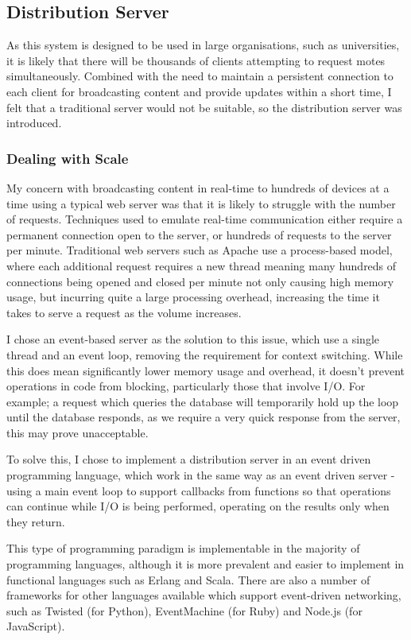 \documentclass[a4papert,11pt,notitlepage]{ltxdoc}
\begin{document}

\subsection{Distribution Server}
As this system is designed to be used in large organisations, such as universities, it is likely that there will be thousands of clients attempting to request motes simultaneously. Combined with the need to maintain a persistent connection to each client for broadcasting content and provide updates within a short time, I felt that a traditional server would not be suitable, so the distribution server was introduced.

\subsubsection{Dealing with Scale}
My concern with broadcasting content in real-time to hundreds of devices at a time using a typical web server was that it is likely to struggle with the number of requests. Techniques used to emulate real-time communication either require a permanent connection open to the server, or hundreds of requests to the server per minute. Traditional web servers such as Apache use a process-based model, where each additional request requires a new thread meaning many hundreds of connections being opened and closed per minute not only causing high memory usage, but incurring quite a large processing overhead, increasing the time it takes to serve a request as the volume increases.

I chose an event-based server as the solution to this issue, which use a single thread and an event loop, removing the requirement for context switching. While this does mean significantly lower memory usage and overhead, it doesn't prevent operations in code from blocking, particularly those that involve I/O. For example; a request which queries the database will temporarily hold up the loop until the database responds, as we require a very quick response from the server, this may prove unacceptable.

To solve this, I chose to implement a distribution server in an event driven programming language, which work in the same way as an event driven server - using a main event loop to support callbacks from functions so that operations can continue while I/O is being performed, operating on the results only when they return.

This type of programming paradigm is implementable in the majority of programming languages, although it is more prevalent and easier to implement in functional languages such as Erlang and Scala. There are also a number of frameworks for other languages available which support event-driven networking, such as Twisted (for Python), EventMachine (for Ruby) and Node.js (for JavaScript). 
\end{document}
